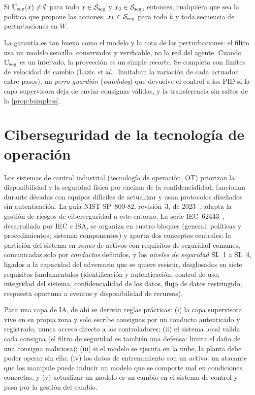 \begin{proposicion}\label{prop:invariancia}
Si $\mathbb{U}_{\mathrm{seg}}(x)\ne\emptyset$ para todo $x\in\mathcal{S}_{\mathrm{seg}}$ y $x_0\in\mathcal{S}_{\mathrm{seg}}$, entonces, cualquiera que sea la política que propone las acciones, $x_k\in\mathcal{S}_{\mathrm{seg}}$ para todo $k$ y toda secuencia de perturbaciones en $W$.
\end{proposicion}

La garantía es tan buena como el modelo y la cota de las perturbaciones: el filtro usa un modelo sencillo, conservador y verificable, no la red del agente. Cuando $\mathbb{U}_{\mathrm{seg}}$ es un intervalo, la proyección es un simple recorte. Se completa con límites de velocidad de cambio (Lazic \emph{et al.}~\cite{lazic} limitaban la variación de cada actuador entre pasos), un \emph{perro guardián} (\emph{watchdog}) que devuelve el control a los PID si la capa supervisora deja de enviar consignas válidas, y la transferencia sin saltos de la \cref{prop:bumpless}.

\addtocounter{definicion}{1}%

\section{Ciberseguridad de la tecnología de operación}

Los sistemas de control industrial (tecnología de operación, OT) priorizan la disponibilidad y la seguridad física por encima de la confidencialidad, funcionan durante décadas con equipos difíciles de actualizar y usan protocolos diseñados sin autenticación. La guía NIST SP~800-82, revisión~3, de 2023~\cite{nist}, adapta la gestión de riesgos de ciberseguridad a este entorno. La serie IEC~62443~\cite{iec62443}, desarrollada por IEC e ISA, se organiza en cuatro bloques (general; políticas y procedimientos; sistema; componentes) y aporta dos conceptos centrales: la partición del sistema en \emph{zonas} de activos con requisitos de seguridad comunes, comunicadas solo por \emph{conductos} definidos, y los \emph{niveles de seguridad} SL~1 a SL~4, ligados a la capacidad del adversario que se quiere resistir, desglosados en siete requisitos fundamentales (identificación y autenticación, control de uso, integridad del sistema, confidencialidad de los datos, flujo de datos restringido, respuesta oportuna a eventos y disponibilidad de recursos).

Para una capa de IA, de ahí se derivan reglas prácticas: (i) la capa supervisora vive en su propia zona y solo escribe consignas por un conducto autenticado y registrado, nunca acceso directo a los controladores; (ii) el sistema local valida cada consigna (el filtro de seguridad es también una defensa: limita el daño de una consigna maliciosa); (iii) si el modelo se ejecuta en la nube, la planta debe poder operar sin ella; (iv) los datos de entrenamiento son un activo: un atacante que los manipule puede inducir un modelo que se comporte mal en condiciones concretas, y (v) actualizar un modelo es un cambio en el sistema de control y pasa por la gestión del cambio.

